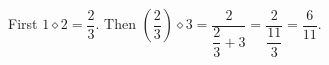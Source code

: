First $1\diamond2=\dfrac{2}{3}$. Then $(\dfrac{2}{3})\diamond3=\dfrac{2}{\dfrac{2}{3}+3}=\dfrac{2}{\dfrac{11}{3}}=\boxed{\dfrac{6}{11}}$.
